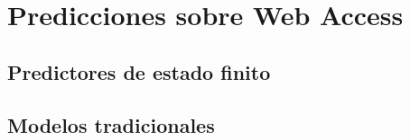 \chapter[Predicciones sobre Web Access]{Predicciones sobre Web Access} 
\label{ch:predicciones-webaccess}




 








\section{Predictores de estado finito}
	

 







\section{Modelos tradicionales}



